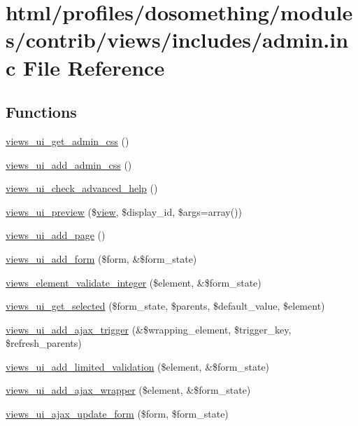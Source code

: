 \hypertarget{admin_8inc}{
\section{html/profiles/dosomething/modules/contrib/views/includes/admin.inc File Reference}
\label{admin_8inc}
}
\subsection*{Functions}
\begin{DoxyCompactItemize}
\item 
\hyperlink{admin_8inc_a1aeee5f53a84b56640cb7e41cf288eb3}{views\_\-ui\_\-get\_\-admin\_\-css} ()
\item 
\hyperlink{admin_8inc_ac18cddd43c4306013528dbdb6acad1cb}{views\_\-ui\_\-add\_\-admin\_\-css} ()
\item 
\hyperlink{admin_8inc_adef4f03f528e350d8153839789f69335}{views\_\-ui\_\-check\_\-advanced\_\-help} ()
\item 
\hyperlink{admin_8inc_a8247ea2489427e7e277cf59114210dcf}{views\_\-ui\_\-preview} (\$\hyperlink{classview}{view}, \$display\_\-id, \$args=array())
\item 
\hyperlink{admin_8inc_af5b029abb01c601d29c40a83733a725d}{views\_\-ui\_\-add\_\-page} ()
\item 
\hyperlink{admin_8inc_a82a525bcb27911c9d0bf7bfc4edd97ae}{views\_\-ui\_\-add\_\-form} (\$form, \&\$form\_\-state)
\item 
\hyperlink{admin_8inc_a31abc35bd1848799b48a57136d0ab330}{views\_\-element\_\-validate\_\-integer} (\$element, \&\$form\_\-state)
\item 
\hyperlink{admin_8inc_abb2d96e81ac96a731965b5fddd4838d2}{views\_\-ui\_\-get\_\-selected} (\$form\_\-state, \$parents, \$default\_\-value, \$element)
\item 
\hyperlink{admin_8inc_a2f6e0bb2277ca811077c8cf19e909069}{views\_\-ui\_\-add\_\-ajax\_\-trigger} (\&\$wrapping\_\-element, \$trigger\_\-key, \$refresh\_\-parents)
\item 
\hyperlink{admin_8inc_a77ce1a8b53feb8ec8c024fa4eb8c18e3}{views\_\-ui\_\-add\_\-limited\_\-validation} (\$element, \&\$form\_\-state)
\item 
\hyperlink{admin_8inc_a5c7fbab40819d08a0223ac25532cc82c}{views\_\-ui\_\-add\_\-ajax\_\-wrapper} (\$element, \&\$form\_\-state)
\item 
\hyperlink{admin_8inc_acd279b8aabc8e5694badc5a140b11aa6}{views\_\-ui\_\-ajax\_\-update\_\-form} (\$form, \$form\_\-state)

\end{DoxyCompactItemize}

